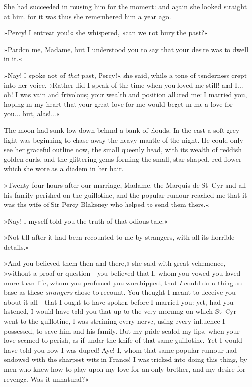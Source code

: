 She had succeeded in rousing him for the moment: and again she looked straight at him, for it was thus she remembered him a year ago.

»Percy! I entreat you!« she whispered, »can we not bury the past?«

»Pardon me, Madame, but I understood you to say that your desire was to dwell in it.«

»Nay! I spoke not of \textit{that} past, Percy!« she said, while a tone of tenderness crept into her voice. »Rather did I speak of the time when you loved me still! and I... oh! I was vain and frivolous; your wealth and position allured me: I married you, hoping in my heart that your great love for me would beget in me a love for you... but, alas!...«

The moon had sunk low down behind a bank of clouds. In the east a soft grey light was beginning to chase away the heavy mantle of the night. He could only see her graceful outline now, the small queenly head, with its wealth of reddish golden curls, and the glittering gems forming the small, star-shaped, red flower which she wore as a diadem in her hair.

»Twenty-four hours after our marriage, Madame, the Marquis de St~Cyr and all his family perished on the guillotine, and the popular rumour reached me that it was the wife of Sir Percy Blakeney who helped to send them there.«

»Nay! I myself told you the truth of that odious tale.«

»Not till after it had been recounted to me by strangers, with all its horrible details.«

»And you believed them then and there,« she said with great vehemence, »without a proof or question\allowbreak---\allowbreak you believed that I, whom you vowed you loved more than life, whom you professed you worshipped, that \textit{I} could do a thing so base as these \textit{strangers} chose to recount. You thought I meant to deceive you about it all\allowbreak---\allowbreak that I ought to have spoken before I married you: yet, had you listened, I would have told you that up to the very morning on which St~Cyr went to the guillotine, I was straining every nerve, using every influence I possessed, to save him and his family. But my pride sealed my lips, when your love seemed to perish, as if under the knife of that same guillotine. Yet I would have told you how I was duped! Aye! I, whom that same popular rumour had endowed with the sharpest wits in France! I was tricked into doing this thing, by men who knew how to play upon my love for an only brother, and my desire for revenge. Was it unnatural?«

